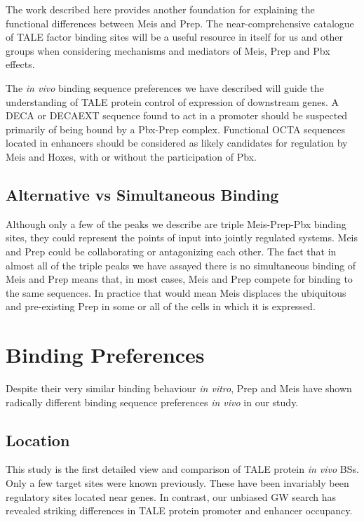 The work described here provides another foundation for explaining the functional differences between Meis and Prep. The near-comprehensive catalogue of \ac{TALE} factor binding sites will be a useful resource in itself for us and other groups when considering mechanisms and mediators of Meis, Prep and Pbx effects. 

The \textit{in vivo} binding sequence preferences we have  described will guide the understanding of \ac{TALE} protein control of expression of downstream genes. A \ac{DECA} or \ac{DECAEXT} sequence found to act in a promoter should be suspected primarily of being bound by a Pbx-Prep complex. Functional \ac{OCTA} sequences located in enhancers should be considered as likely candidates for regulation by Meis and Hoxes, with or without the participation of Pbx. 

\subsection{Alternative vs Simultaneous Binding}

Although only a few of the peaks we describe are triple Meis-Prep-Pbx binding sites, they could represent the points of input into jointly regulated systems. Meis and Prep could be collaborating or antagonizing each other. The fact that in almost all of the triple peaks we have assayed there is no simultaneous binding of Meis and Prep means that, in most cases, Meis and Prep compete for binding to the same sequences. In practice that would mean Meis displaces the ubiquitous and pre-existing Prep in some or all of the cells in which it is expressed. 

\section{Binding Preferences}

Despite their very similar binding behaviour \textit{in vitro}, Prep and Meis have shown radically different binding sequence preferences \textit{in vivo} in our study. 

\subsection{Location}

This study is the first detailed view and comparison of \ac{TALE} protein \textit{in vivo} \acp{BS}. Only a few target sites were known previously. These have been invariably been regulatory sites located near genes. In contrast, our unbiased \ac{GW} search has revealed striking differences in \ac{TALE} protein promoter and enhancer occupancy. 

